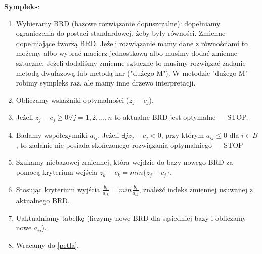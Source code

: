 \documentclass[12pt]{article}
\begin{document}
\textbf{Sympleks}:
\begin{enumerate}
	\item Wybieramy BRD (bazowe rozwiązanie dopuszczalne): dopełniamy ograniczenia do postaci standardowej, żeby były równości. Zmienne dopełniające tworzą BRD. Jeżeli rozwiązanie mamy dane z równościami to możemy albo wybrać macierz jednostkową albo musimy dodać zmienne sztuczne. Jeżeli dodaliśmy zmienne sztuczne to musimy rozwiązać zadanie metodą dwufazową lub metodą kar ("dużego M"). W metodzie "dużego M" robimy sympleks raz, ale mamy inne drzewo interpretacji.
	\item \label{petla} Obliczamy wskaźniki optymalności ($z_{j} - c_{j}$).
	\item Jeżeli $z_{j} - c_{j} \geq 0 \forall j = 1,2,...,n$ to aktualne BRD jest optymalne --- STOP.
	\item Badamy współczynniki $a_{ij}$. Jeżeli $ \exists j z_{j} - c_{j} < 0$, przy którym $a_{ij} \leq 0$ dla $i \in B$, to zadanie nie posiada skończonego rozwiązania optymalniego --- STOP
	\item Szukamy niebazowej zmiennej, która wejdzie do bazy nowego BRD za pomocą kryterium wejścia  $z_{k} - c_{k} = min\{ z_{j} - c_{j}\}$.
	\item Stosując kryterium wyjścia $\frac{b_{r}}{a_{rk}} = min{\frac{b_{i}}{a_{ik}}}$, znaleźć indeks zmiennej usuwanej z aktualnego BRD.
	\item Uaktualniamy tabelkę (liczymy nowe BRD dla sąsiedniej bazy i obliczamy nowe $a_{ij}$).
	\item Wracamy do \ref{petla}.
\end{enumerate}
\end{document}
